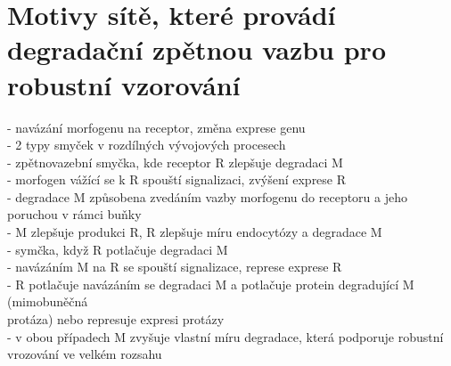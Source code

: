 \documentclass[11pt,a4paper]{report}
\begin{document}
\section{Motivy sítě, které provádí degradační zpětnou vazbu pro robustní vzorování}
- navázání morfogenu na receptor, změna exprese genu\\
\indent - 2 typy smyček v rozdílných vývojových procesech\\
- zpětnovazební smyčka, kde receptor R zlepšuje degradaci M\\
\indent - morfogen vážící se k R spouští signalizaci, zvýšení exprese R\\
\indent - degradace M způsobena zvedáním vazby morfogenu do receptoru a jeho poruchou v rámci buňky\\
\indent - M zlepšuje produkci R, R zlepšuje míru endocytózy a degradace M\\
- symčka, když R potlačuje degradaci M\\
\indent - navázáním M na R se spouští signalizace, represe exprese R\\
\indent - R potlačuje navázáním se degradaci M a potlačuje protein degradující M (mimobuněčná\\
\indent \indent protáza) nebo represuje expresi protázy\\
- v obou případech M zvyšuje vlastní míru degradace, která podporuje robustní vrozování ve velkém rozsahu\\
\end{document}
